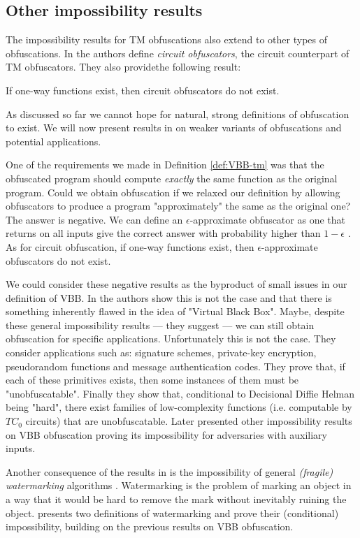\subsection{Other impossibility results}

The impossibility results for TM obfuscations also extend to other types of obfuscations.
In \cite{VBB-imp} the authors define \emph{circuit obfuscators}, the circuit counterpart of TM obfuscators. They also providethe following result:

\begin{mytheorem}
	If one-way functions exist, then circuit obfuscators do not exist.
\end{mytheorem}

As discussed so far we cannot hope for natural, strong definitions of obfuscation to exist. We will now present results in \cite{VBB-imp} on weaker variants of obfuscations and potential applications.

One of the requirements we made in Definition \ref{def:VBB-tm} was that the obfuscated program should compute \emph{exactly} the same function as the original program. Could we obtain obfuscation if we relaxed our definition by allowing obfuscators to produce a program "approximately" the same as the original one?
The answer is negative. We can define an $\epsilon$-approximate obfuscator as one that returns on all inputs give the correct answer with probability higher than $1-\epsilon$ \cite{VBB-imp}. As for circuit obfuscation, if one-way functions exist, then $\epsilon$-approximate obfuscators do not exist.

We could consider these negative results as the byproduct of small issues in our definition of VBB. In \cite{VBB-imp} the authors show this is not the case and that there is something inherently flawed in the idea of "Virtual Black Box". Maybe, despite these general impossibility results --- they suggest --- we can still obtain obfuscation for specific applications. Unfortunately this is not the case. They consider applications such as: signature schemes, private-key encryption, pseudorandom functions and message authentication codes. They prove that, if each of these primitives exists, then some instances of them must be "unobfuscatable".
Finally they show that, conditional to Decisional Diffie Helman being "hard", there exist families of low-complexity functions (i.e. computable by $TC_0$ circuits) that are unobfuscatable.
Later \cite{VBB-imp-aux} presented other impossibility results on VBB obfuscation proving its impossibility for adversaries with auxiliary inputs.

Another consequence of the results in \cite{VBB-imp} is the impossibility of general \emph{(fragile) watermarking} algorithms \cite{collberg2002watermarking}. 
Watermarking is the problem of marking an object in a way that it would be hard to remove the mark without inevitably ruining the object. \cite{VBB-imp} presents two definitions of watermarking and prove their (conditional) impossibility, building on the previous results on VBB obfuscation.


